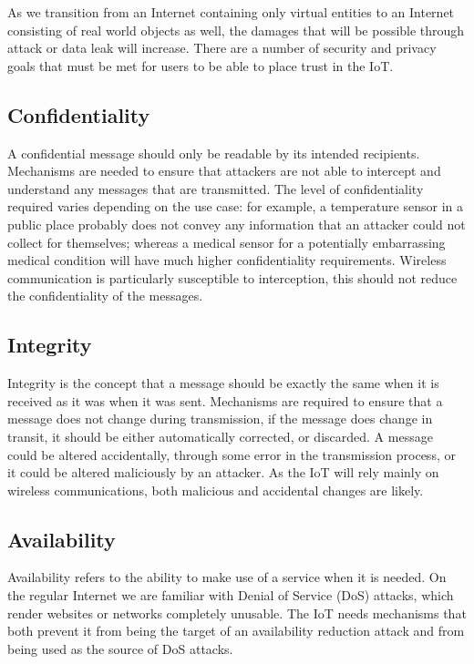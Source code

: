 \documentclass[10pt,journal,compsoc]{IEEEtran}
\begin{document}
As we transition from an Internet containing only virtual entities to an
Internet consisting of real world objects as well, the damages that will be
possible through attack or data leak will increase. There are a number of
security and privacy goals that must be met for users to be able to place trust
in the IoT.

\subsection{Confidentiality}
A confidential message should only be readable by its intended recipients.
Mechanisms are needed to ensure that attackers are not able to intercept and
understand any messages that are transmitted. The level of confidentiality
required varies depending on the use case: for example, a temperature sensor in
a public place probably does not convey any information that an attacker could
not collect for themselves; whereas a medical sensor for a potentially
embarrassing medical condition will have much higher confidentiality
requirements. Wireless communication is particularly susceptible to
interception, this should not reduce the confidentiality of the messages.  

\subsection{Integrity}
Integrity is the concept that a message should be exactly the same when it is
received as it was when it was sent. Mechanisms are required to ensure that a
message does not change during transmission, if the message does change in
transit, it should be either automatically corrected, or discarded. A message
could be altered accidentally, through some error in the transmission process,
or it could be altered maliciously by an attacker. As the IoT will rely mainly
on wireless communications, both malicious and accidental changes are likely. 

\subsection{Availability}
Availability refers to the ability to make use of a service when it is needed.
On the regular Internet we are familiar with Denial of Service (DoS) attacks,
which render websites or networks completely unusable. The IoT needs mechanisms
that both prevent it from being the target of an availability reduction attack
and from being used as the source of DoS attacks.
\end{document}
